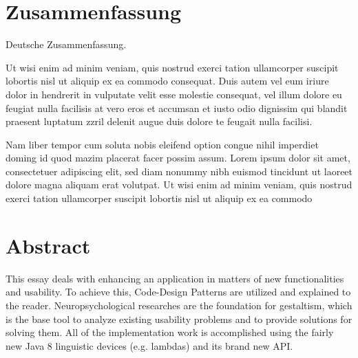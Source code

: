 \thispagestyle{empty}
\section*{Zusammenfassung}
Deutsche Zusammenfassung.

Ut wisi enim ad minim veniam, quis nostrud exerci tation ullamcorper suscipit
lobortis nisl ut aliquip ex ea commodo consequat. Duis autem vel eum iriure
dolor in hendrerit in vulputate velit esse molestie consequat, vel illum dolore
eu feugiat nulla facilisis at vero eros et accumsan et iusto odio dignissim qui
blandit praesent luptatum zzril delenit augue duis dolore te feugait nulla
facilisi.   

Nam liber tempor cum soluta nobis eleifend option congue nihil imperdiet doming
id quod mazim placerat facer possim assum. Lorem ipsum dolor sit amet,
consectetuer adipiscing elit, sed diam nonummy nibh euismod tincidunt ut
laoreet dolore magna aliquam erat volutpat. Ut wisi enim ad minim veniam, quis
nostrud exerci tation ullamcorper suscipit lobortis nisl ut aliquip ex ea
commodo

\section*{Abstract}
This essay deals with enhancing an application in matters of new functionalities and usability. To achieve this, Code-Design Patterns are utilized and explained to the reader. Neuropsychological researches are the foundation for gestaltism, which is the base tool to analyze existing usability problems and to provide solutions for solving them. All of the implementation work is accomplished using the fairly new Java 8 linguistic devices (e.g. lambdas) and its brand new API.